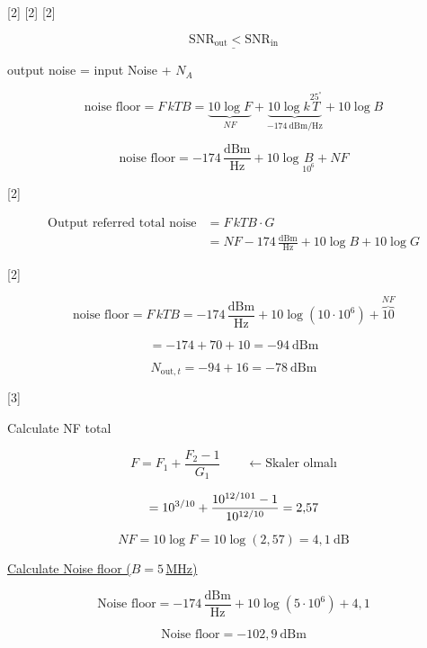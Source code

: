 \documentclass[11pt,a4paper]{article}
\begin{document}
[2]
[2]
[2]

\[ \underline{\mathrm{SNR}_{\mathrm{out}} < \mathrm{SNR}_{\mathrm{in}}} \]

output noise = input Noise + $N_A$

\[ \text{noise floor} = F\,kTB = \underbrace{10\log F}_{NF} + \underbrace{10\log k\overset{25^\circ}{T}}_{-174\ \mathrm{dBm/Hz}} + 10\log B \]

\[ \text{noise floor} = -174\,\frac{\mathrm{dBm}}{\mathrm{Hz}} + 10\log\underset{10^6}{B} + NF \]

[2]

\begin{align*}
\text{Output referred total noise} &= F\,kTB\cdot G \\
&= NF - 174\,\frac{\mathrm{dBm}}{\mathrm{Hz}} + 10\log B + 10\log G
\end{align*}

\begin{ornek}
[2]
\end{ornek}

\[ \text{noise floor} = F\,kTB = -174\,\frac{\mathrm{dBm}}{\mathrm{Hz}} + 10\log(10\cdot 10^6) + \overbrace{10}^{NF} \]

\[ = -174 + 70 + 10 = -94\ \mathrm{dBm} \]

\[ N_{\mathrm{out},t} = -94 + 16 = -78\ \mathrm{dBm} \]

\begin{ornek}
[3]
\end{ornek}

Calculate NF total

\[ F = F_1 + \frac{F_2-1}{G_1} \qquad \leftarrow \text{Skaler olmalı} \]

\[ = 10^{3/10} + \frac{10^{12/10}\footnotemark - 1}{10^{12/10}} = 2{,}57 \]

\[ NF = 10\log F = 10\log(2{,}57) = 4{,}1\ \mathrm{dB} \]

\underline{Calculate Noise floor ($B = 5\,$MHz)}

\[ \text{Noise floor} = -174\,\frac{\mathrm{dBm}}{\mathrm{Hz}} + 10\log(5\cdot 10^6) + 4{,}1 \]

\[ \text{Noise floor} = -102{,}9\ \mathrm{dBm} \]
\end{document}
